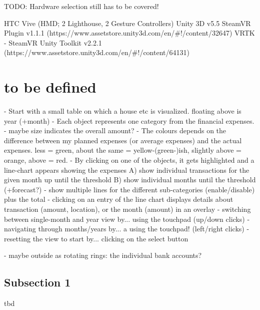 TODO: Hardware selection still has to be covered!

HTC Vive (HMD; 2 Lighthouse, 2 Gesture Controllers)
Unity 3D v5.5
SteamVR Plugin v1.1.1 (https://www.assetstore.unity3d.com/en/#!/content/32647)
VRTK - SteamVR Unity Toolkit v2.2.1 (https://www.assetstore.unity3d.com/en/#!/content/64131)

\cite{Valve2016a}
\cite{Sysdia2016}


\section{to be defined}



- Start with a small table on which a house etc is visualized. floating above is year (+month)
- Each object represents one category from the financial expenses.
- maybe size indicates the overall amount?
- The colours depends on the difference between my planned expenses (or average expenses) and the actual expenses. less = green, about the same = yellow-(green-)ish, slightly above = orange, above = red.
- By clicking on one of the objects, it gets highlighted and a line-chart appears showing the expenses
A) show individual transactions for the given month up until the threshold
B) show individual months until the threshold (+forecast?)
- show multiple lines for the different sub-categories (enable/disable) plus the total
- clicking on an entry of the line chart displays details about transaction (amount, location), or the month (amount) in an overlay
- switching between single-month and year view by... using the touchpad (up/down clicks)
- navigating through months/years by... a using the touchpad! (left/right clicks)
- resetting the view to start by... clicking on the select button

- maybe outside as rotating rings: the individual bank accounts?




\subsection{Subsection 1}

tbd


